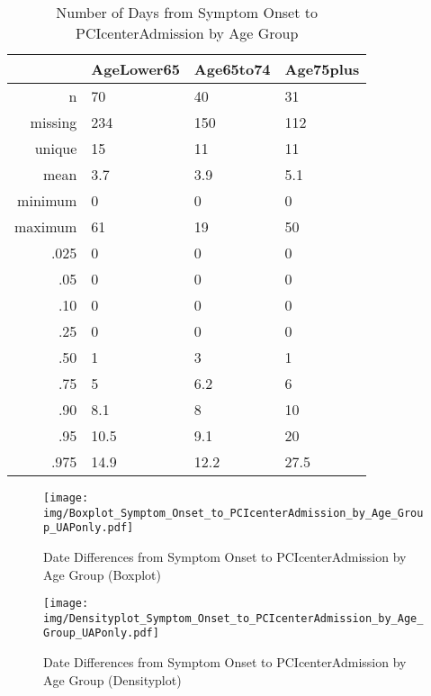 \documentclass[a4paper]{report}
\begin{document}
\begin{itemize}
{\clearpage

\begin{table}[ht]
\centering
\begin{tabular}{rlll}
  \toprule
 & AgeLower65 & Age65to74 & Age75plus \\ 
  \midrule
n & 70 & 40 & 31 \\ 
  missing & 234 & 150 & 112 \\ 
  unique & 15 & 11 & 11 \\ 
  mean & 3.7 & 3.9 & 5.1 \\ 
  minimum & 0 & 0 & 0 \\ 
  maximum & 61 & 19 & 50 \\ 
  .025 & 0 & 0 & 0 \\ 
  .05 & 0 & 0 & 0 \\ 
  .10 & 0 & 0 & 0 \\ 
  .25 & 0 & 0 & 0 \\ 
  .50 & 1 & 3 & 1 \\ 
  .75 & 5 & 6.2 & 6 \\ 
  .90 & 8.1 & 8 & 10 \\ 
  .95 & 10.5 & 9.1 & 20 \\ 
  .975 & 14.9 & 12.2 & 27.5 \\ 
   \bottomrule
\end{tabular}
\caption{Number of Days from Symptom Onset to PCIcenterAdmission by Age Group} 
\end{table}
\begin{figure}
  \centering
  \caption{Date Differences from Symptom Onset to PCIcenterAdmission by Age Group (Boxplot)}
  \label{Boxplot: Date Differences from Symptom Onset to PCIcenterAdmission by Age Group}
\texttt{[image: img/Boxplot\_Symptom\_Onset\_to\_PCIcenterAdmission\_by\_Age\_Group\_UAPonly.pdf]}\end{figure}


\begin{figure}
  \centering
  \caption{Date Differences from Symptom Onset to PCIcenterAdmission by Age Group (Densityplot)}
  \label{Density: Date Differences from Symptom Onset to PCIcenterAdmission by Age Group}
\texttt{[image: img/Densityplot\_Symptom\_Onset\_to\_PCIcenterAdmission\_by\_Age\_Group\_UAPonly.pdf]}\end{figure}


\clearpage

}
\end{itemize}
\end{document}
